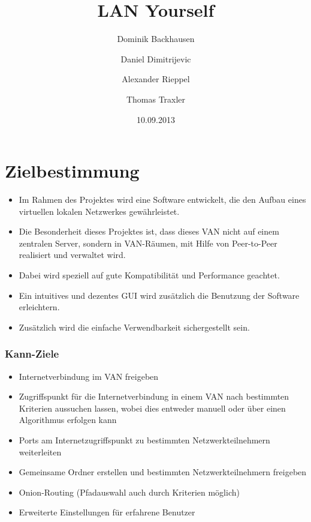 \documentclass[a4paper,12pt]{scrreprt}
\begin{document}
\author{Dominik Backhausen \and Daniel Dimitrijevic \and Alexander Rieppel \and Thomas Traxler}
\subject{Lastenheft}
\title{LAN Yourself}
\date{10.09.2013}
\maketitle
\tableofcontents

	
\chapter{Zielbestimmung}
	\begin{itemize}
	\item Im Rahmen des Projektes wird eine Software entwickelt, die den Aufbau eines virtuellen lokalen Netzwerkes gewährleistet.
	\item Die Besonderheit dieses Projektes ist, dass dieses VAN nicht auf einem zentralen Server, sondern in VAN-Räumen, mit Hilfe von Peer-to-Peer realisiert und verwaltet wird.
	\item Dabei wird speziell auf gute Kompatibilität und Performance geachtet.
	\item Ein intuitives und dezentes GUI wird zusätzlich die Benutzung der Software erleichtern.
	\item Zusätzlich wird die einfache Verwendbarkeit sichergestellt sein.
	\end{itemize}
	
	\subsection{Kann-Ziele}
	
	\begin{itemize}
	\item Internetverbindung im VAN freigeben
	\item Zugriffspunkt für die Internetverbindung in einem VAN nach bestimmten Kriterien aussuchen lassen, wobei dies entweder manuell oder über einen Algorithmus erfolgen kann
	\item Ports am Internetzugriffspunkt zu bestimmten Netzwerkteilnehmern weiterleiten
	\item Gemeinsame Ordner erstellen und bestimmten Netzwerkteilnehmern freigeben
	\item Onion-Routing (Pfadauswahl auch durch Kriterien möglich)
	\item Erweiterte Einstellungen für erfahrene Benutzer
	
	\end{itemize}
	
\end{document}
